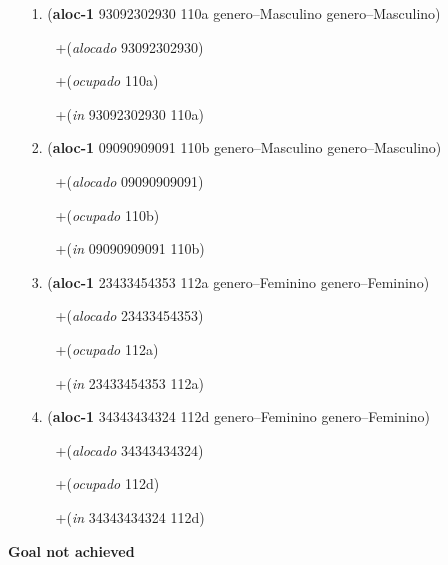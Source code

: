 \documentclass{article}
\begin{document}
\begin{itemize}
\item[1.] (\textbf{aloc-1} 93092302930 110a genero--Masculino genero--Masculino)
\begin{itemize}
	\item[\textbullet] +(\textit{alocado} 93092302930)
	\item[\textbullet] +(\textit{ocupado} 110a)
	\item[\textbullet] +(\textit{in} 93092302930 110a)
\end{itemize}
\item[2.] (\textbf{aloc-1} 09090909091 110b genero--Masculino genero--Masculino)
\begin{itemize}
	\item[\textbullet] +(\textit{alocado} 09090909091)
	\item[\textbullet] +(\textit{ocupado} 110b)
	\item[\textbullet] +(\textit{in} 09090909091 110b)
\end{itemize}
\item[3.] (\textbf{aloc-1} 23433454353 112a genero--Feminino genero--Feminino)
\begin{itemize}
	\item[\textbullet] +(\textit{alocado} 23433454353)
	\item[\textbullet] +(\textit{ocupado} 112a)
	\item[\textbullet] +(\textit{in} 23433454353 112a)
\end{itemize}
\item[4.] (\textbf{aloc-1} 34343434324 112d genero--Feminino genero--Feminino)
\begin{itemize}
	\item[\textbullet] +(\textit{alocado} 34343434324)
	\item[\textbullet] +(\textit{ocupado} 112d)
	\item[\textbullet] +(\textit{in} 34343434324 112d)
\end{itemize}
\end{itemize}

\hline
\vspace{10pt}
\large \textbf{Goal not achieved}
\end{document}
